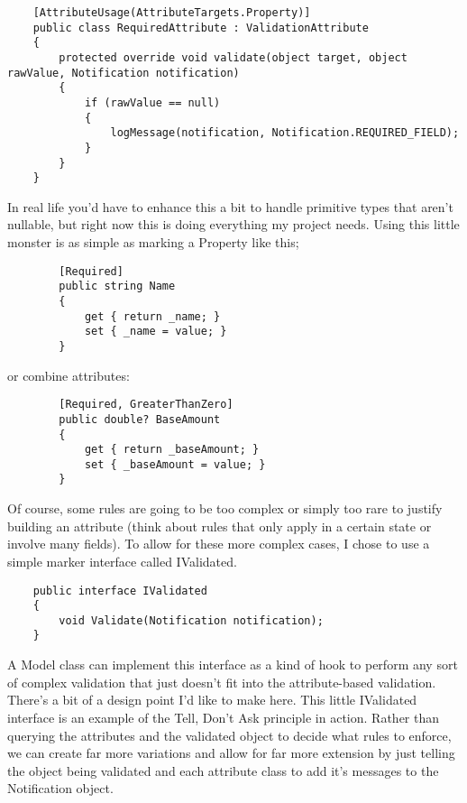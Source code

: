 \documentclass{article}
\begin{document}
{ \begin{lstlisting}
    [AttributeUsage(AttributeTargets.Property)]
    public class RequiredAttribute : ValidationAttribute
    {
        protected override void validate(object target, object rawValue, Notification notification)
        {
            if (rawValue == null)
            {
                logMessage(notification, Notification.REQUIRED_FIELD);
            }
        }
    }
\end{lstlisting}	

In real life you'd have to enhance this a bit to handle primitive types that aren't nullable, but right now this is doing everything my project needs.  Using this little monster is as simple as marking a Property like this;

 \begin{lstlisting}
        [Required]
        public string Name
        {
            get { return _name; }
            set { _name = value; }
        }
\end{lstlisting}		

or combine attributes:
\begin{lstlisting}
        [Required, GreaterThanZero]
        public double? BaseAmount
        {
            get { return _baseAmount; }
            set { _baseAmount = value; }
        }
\end{lstlisting}
 

Of course, some rules are going to be too complex or simply too rare to justify building an attribute (think about rules that only apply in a certain state or involve many fields).  To allow for these more complex cases, I chose to use a simple marker interface called IValidated.
\begin{lstlisting}
    public interface IValidated
    {
        void Validate(Notification notification);
    }
\end{lstlisting}	

A Model class can implement this interface as a kind of hook to perform any sort of complex validation that just doesn't fit into the attribute-based validation.  There's a bit of a design point I'd like to make here.  This little IValidated interface is an example of the Tell, Don't Ask principle in action.  Rather than querying the attributes and the validated object to decide what rules to enforce, we can create far more variations and allow for far more extension by just telling the object being validated and each attribute class to add it's messages to the Notification object. 

}
\end{document}
